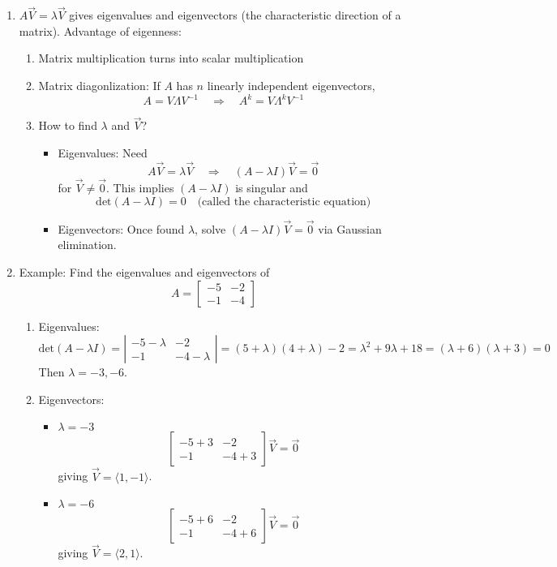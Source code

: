 \documentclass{article}
\begin{document}
\begin{enumerate}
\item $A\vec{V} = \lambda \vec{V}$ gives eigenvalues and eigenvectors (the characteristic direction of a matrix). Advantage of eigenness:
\begin{enumerate}
\item Matrix multiplication turns into scalar multiplication
\item Matrix diagonlization: If $A$ has $n$ linearly independent eigenvectors,
\[
A = V \Lambda V^{-1} \quad \Rightarrow \quad A^k = V \Lambda^k V^{-1}
\]
\item How to find $\lambda$ and $\vec{V}$?
\begin{itemize}
\item Eigenvalues: Need 
\[
A\vec{V} = \lambda \vec{V} \quad \Rightarrow \quad (A-\lambda I)\vec{V} = \vec{0}
\]
for $\vec{V} \neq \vec{0}$. This implies $(A-\lambda I)$ is singular and
\[
\text{det}(A-\lambda I) = 0 \quad \text{(called the characteristic equation)}
\]
\item Eigenvectors: Once found $\lambda$, solve $(A-\lambda I)\vec{V} = \vec{0}$ via Gaussian elimination.
\end{itemize}
\end{enumerate}

\item Example: Find the eigenvalues and eigenvectors of
\[
A = 
\begin{bmatrix}
-5 & -2 \\
-1 & -4
\end{bmatrix}
\]
\begin{enumerate}
\item Eigenvalues:
\[
\text{det}(A-\lambda I) = \left|
\begin{array}{cc}
-5-\lambda & -2 \\
-1 & -4-\lambda
\end{array} \right|
= (5+\lambda)(4+\lambda)-2 
= \lambda^2 + 9 \lambda + 18
= (\lambda+6)(\lambda+3) = 0
\]
Then $\lambda = -3, -6$.
\item Eigenvectors:
\begin{itemize}
\item $\lambda = -3$
\[
\begin{bmatrix}
-5+3 & -2 \\
-1 & -4+3
\end{bmatrix}
\vec{V} = \vec{0}
\]
giving $\vec{V} = \langle 1, -1 \rangle$.
\item $\lambda = -6$
\[
\begin{bmatrix}
-5+6 & -2 \\
-1 & -4+6
\end{bmatrix}
\vec{V} = \vec{0}
\]
giving $\vec{V} = \langle 2, 1 \rangle$.
\end{itemize}
\end{enumerate}


\end{enumerate}
\end{document}
